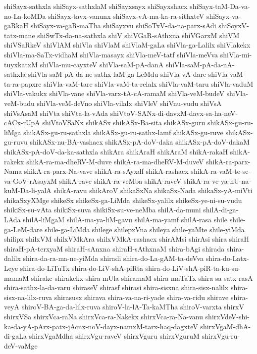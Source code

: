 {shiSayx-sathxla
shiSayx-sathxlaM
shiSayxsayx
shiSayxshacx
shiSayx-taM-Da-va-no-La-koMDa
shiSayx-tavx-vanunx
shiSayx-vA-ma-ka-ra-sithxteV
shiSayx-va-gaRkaH
shiSayx-va-gaR-maTha
shiSayxvu
shiSoTxV-da-na-parx-sAdi
shiSoyxV-tatx-mane
shiSwTx-da-na-sathxla
shiV
shiVGaR-sAthxna
shiVGarxM
shiVM
shiVSaRkeV
shiVlAM
shiVla
shiVlaM
shiVlaM-gaLa
shiVla-ga-Lalilx
shiVlakekx
shiVla-ma-SaTx-vidhaM
shiVla-masayx
shiVla-meV-tatf
shiVla-meVva
shiVla-mi-tuyxkatxM
shiVla-mu-cayxteV
shiVla-saM-pA-danA
shiVla-saM-pA-da-nA-sathxla
shiVla-saM-pA-da-ne-sathx-laM-ga-LeMdu
shiVla-vA-dare
shiVla-vaM-ta-ra-papxre
shiVla-vaM-tare
shiVla-vaM-ta-relalx
shiVla-vaM-taru
shiVla-vaduM
shiVla-vakukx
shiVla-vane
shiVla-varx-tA-cA-ramaM
shiVla-veM-budeV
shiVla-veM-budu
shiVla-veM-deVno
shiVla-vilalx
shiVleV
shiVnu-vudu
shiVsA
shiVsAsaM
shiVta
shiVta-la-vAda
shiVtoV-SANx-di-davxM-davx-sa-ha-neV-cACx-rUpA
shiVtoVSaNx
shikASx
shikASx-Ba-sita
shikASx-guru
shikASx-gu-ru-liMga
shikASx-gu-ru-sathxla
shikASx-gu-ru-sathx-lamf
shikASx-gu-ruve
shikASx-gu-ruvu
shikASx-nu-BA-vashacx
shikASx-pA-doV-daka
shikASx-pA-doV-dakaM
shikASx-pA-doV-da-ka-sathxla
shikAra
shikAraH
shikAraM
shikA-rakaH
shikA-rakekx
shikA-ra-ma-dheRV-M-duve
shikA-ra-ma-dheRV-M-duveV
shikA-ra-parx-Nama
shikA-ra-parx-Na-vave
shikA-ra-sAyxdf
shikA-rashacx
shikA-ra-vaM-te-se-va-GoV-rAsayxM
shikA-rave
shikA-ra-veMba
shikA-raveV
shikA-ra-ve-ya-nU-na-kuM-Da-li-yalA
shikA-ravu
shikAroV
shikaSxNa
shikaSx-Nada
shikaSx-yA-miVti
shikaSxyXMge
shikeSx
shikeSx-ga-LiMda
shikeSx-yalilx
shikeSx-ye-ni-su-vudu
shikiSx-su-vAta
shikiSx-suva
shikiSx-su-ve-neMba
shilA-da-muni
shilA-di-ga-LAda
shilA-liMgaM
shilA-ma-ya-liM-gavu
shilA-ma-yamf
shilA-rasa
shile
shile-ga-LeM-dare
shile-ga-LiMda
shilege
shilepxVna
shileya
shile-yaMte
shile-yiMda
shilipx
shilxVM
shilxVMkAra
shilxVMkA-rashacx
shirAMsi
shirAsi
shira
shiraH
shiraH-pA-terxyaM
shiraH-sAnxna
shiraH-sAthxnaM
shira-bAgi
shirada
shira-dalilx
shira-da-ra-ma-ne-yiMda
shiradi
shira-do-La-gAM-ta-deVva
shira-do-Latx-Leye
shira-do-LiTuTx
shira-do-LiV-shA-piRta
shira-do-LiV-shA-piR-ta-ku-su-mamaM
shirake
shirakekx
shira-mUla
shiramaM
shira-maTaTx
shira-sa-satx-rasA
shira-sathx-la-da-varu
shiraseV
shirasf
shirasi
shira-sisxna
shira-sisx-nalilx
shira-sisx-na-lilx-ruva
shirasusx
shirava
shira-va-na-ri-yade
shira-va-ridu
shirave
shira-veyA
shiroV-BA-ga-da-lilx-ruva
shiroV-la-lA-Ta-kaMTha
shiroV-varxta
shirxV
shirxVSa
shirxVca-raNa
shirxVca-ra-Nakekx
shirxVca-ra-Na-vanu
shirxVdeV-shi-ka-da-yA-pArx-patx-jAcnx-noV-dayx-namxM-tarx-haq-dagxteV
shirxVgaM-dhA-di-gaLa
shirxVgaMdha
shirxVgu-raveV
shirxVguru
shirxVguruM
shirxVgu-ru-deV-vaMge
}
